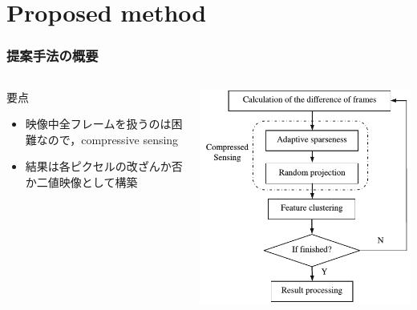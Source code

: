 \section{Proposed method}

\begin{frame}\frametitle{提案手法の概要}
    \begin{columns}
        \begin{column}{0.5\textwidth} %
            \begin{block}{要点}
            \begin{itemize}
                \item 映像中全フレームを扱うのは困難なので，compressive sensing
                \item 結果は各ピクセルの改ざんか否か二値映像として構築
            \end{itemize}
            \end{block}
        \end{column}
        \begin{column}{0.5\textwidth} %
            \includegraphics[scale=0.4]{figure/flow.png}
        \end{column}
    \end{columns}
\end{frame}


